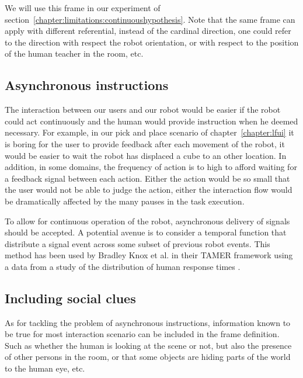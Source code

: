 We will use this frame in our experiment of section~\ref{chapter:limitations:continuoushypothesis}. Note that the same frame can apply with different referential, instead of the cardinal direction, one could refer to the direction with respect the robot orientation, or with respect to the position of the human teacher in the room, etc.

\subsection{Asynchronous instructions}

The interaction between our users and our robot would be easier if the robot could act continuously and the human would provide instruction when he deemed necessary. For example, in our pick and place scenario of chapter~\ref{chapter:lfui} it is boring for the user to provide feedback after each movement of the robot, it would be easier to wait the robot has displaced a cube to an other location. In addition, in some domains, the frequency of action is to high to afford waiting for a feedback signal between each action. Either the action would be so small that the user would not be able to judge the action, either the interaction flow would be dramatically affected by the many pauses in the task execution.

To allow for continuous operation of the robot, asynchronous delivery of signals should be accepted. A potential avenue is to consider a temporal function that distribute a signal event across some subset of previous robot events. This method has been used by Bradley Knox et al. in their TAMER framework \cite{knox2009interactively} using a data from a study of the distribution of human response times \cite{hockley1984analysis}.

\subsection{Including social clues}

As for tackling the problem of asynchronous instructions, information known to be true for most interaction scenario can be included in the frame definition.  Such as whether the human is looking at the scene or not, but also the presence of other persons in the room, or that some objects are hiding parts of the world to the human eye, etc.
